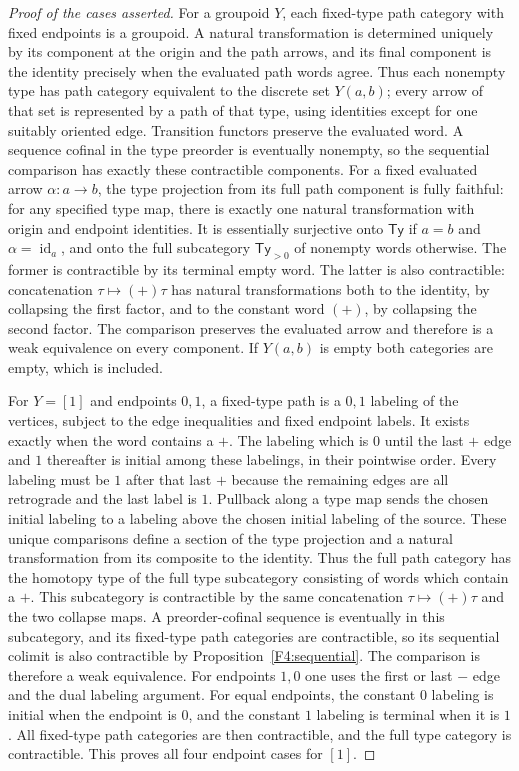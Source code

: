 \documentclass[11pt,a4paper]{article}
\theoremstyle{definition}
\theoremstyle{remark}
\begin{document}
\begin{proof}[Proof of the cases asserted]
For a groupoid $Y$, each fixed-type path category with fixed endpoints
is a groupoid.  A natural transformation is determined uniquely by
its component at the origin and the path arrows, and its final
component is the identity precisely when the evaluated path words
agree.  Thus each nonempty type has path category equivalent to the
discrete set $Y(a,b)$; every arrow of that set is represented by a
path of that type, using identities except for one suitably oriented
edge.  Transition functors preserve the evaluated word.  A sequence
cofinal in the type preorder is eventually nonempty, so the sequential
comparison has exactly these contractible components.  For a fixed
evaluated arrow $\alpha:a\to b$, the type projection from its full
path component is fully faithful: for any specified type map, there
is exactly one natural transformation with origin and endpoint
identities.  It is essentially surjective onto $\mathsf{Ty}$ if $a=b$
and $\alpha=\operatorname{id}_a$, and onto the full subcategory
$\mathsf{Ty}_{>0}$ of nonempty words otherwise.  The former is
contractible by its terminal empty word.  The latter is also
contractible: concatenation $\tau\mapsto (+)\tau$ has natural
transformations both to the identity, by collapsing the first
factor, and to the constant word $(+)$, by collapsing the second
factor.  The comparison preserves the evaluated arrow and therefore
is a weak equivalence on every component.  If $Y(a,b)$ is empty both
categories are empty, which is included.

For $Y=[1]$ and endpoints $0,1$, a fixed-type path is a $0,1$ labeling
of the vertices, subject to the edge inequalities and fixed endpoint
labels.  It exists exactly when the word contains a $+$.
The labeling which is $0$ until the last $+$ edge and $1$ thereafter
is initial among these labelings, in their pointwise order.  Every
labeling must be $1$ after that last $+$ because the remaining edges
are all retrograde and the last label is $1$.  Pullback along a type
map sends the chosen initial labeling to a labeling above the chosen
initial labeling of the source.  These unique comparisons define a
section of the type projection and a natural transformation from its
composite to the identity.  Thus the full path category has the
homotopy type of the full type subcategory consisting of words which
contain a $+$.  This subcategory is contractible by the same
concatenation $\tau\mapsto(+)\tau$ and the two collapse maps.
A preorder-cofinal sequence is eventually in this subcategory, and
its fixed-type path categories are contractible, so its sequential
colimit is also contractible by Proposition~\ref{F4:sequential}.
The comparison is therefore a weak equivalence.  For endpoints $1,0$
one uses the first or last $-$ edge and the dual labeling argument.
For equal endpoints, the constant $0$ labeling is initial when the
endpoint is $0$, and the constant $1$ labeling is terminal when it is
$1$.  All fixed-type path categories are then contractible, and the
full type category is contractible.  This proves all four endpoint
cases for $[1]$.
\end{proof}
\end{document}

